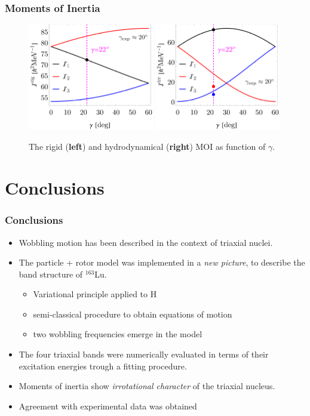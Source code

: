 \documentclass[
	11pt, %
]{beamer}
\begin{document}
\begin{frame}
	\frametitle{Moments of Inertia}
	\begin{figure}	
		\begin{center}
			\includegraphics[width=0.49\textwidth]{figures/rigid-mois.png}
			\includegraphics[width=0.49\textwidth]{figures/hydro-mois.png}
			\caption{The rigid (\textbf{left}) and hydrodynamical (\textbf{right}) MOI as function of $\gamma$.}
		\end{center}
	\end{figure}
\end{frame}

\section{Conclusions}

\begin{frame}
	\frametitle{Conclusions}
	\begin{itemize}
		\item Wobbling motion has been described in the context of triaxial nuclei.
		\item The particle + rotor model was implemented in a \emph{new picture}, to describe the band structure of $^{163}$Lu.
		\begin{itemize}
			\item Variational principle applied to H
			\item semi-classical procedure to obtain equations of motion
			\item two wobbling frequencies emerge in the model
		\end{itemize}
		\item The four triaxial bands were numerically evaluated in terms of their excitation energies trough a fitting procedure.
		\item Moments of inertia show \emph{irrotational character} of the triaxial nucleus.
		\item Agreement with experimental data was obtained
	\end{itemize}
\end{frame}
\end{document}
